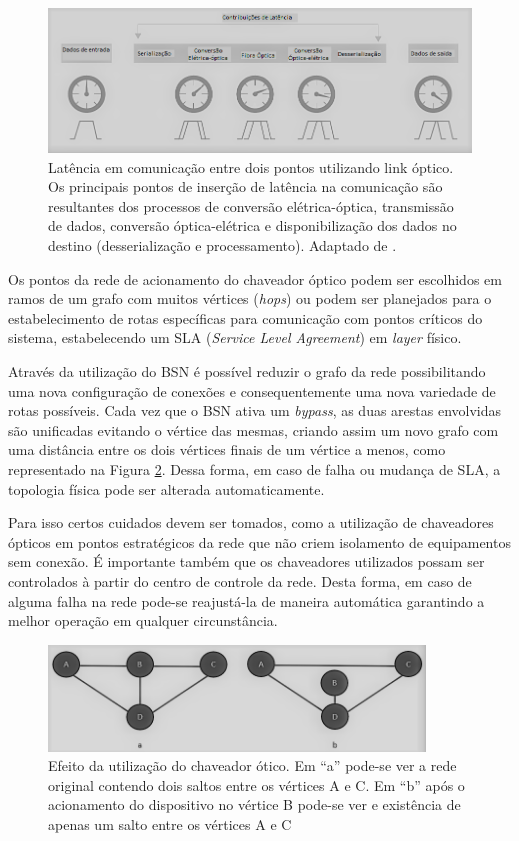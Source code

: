 \documentclass[12pt]{article}
\begin{document}
\begin{figure} %
	\centering
	\includegraphics[width=12cm]{latency_link}
	\caption{Latência em comunicação entre dois pontos utilizando link óptico. Os principais pontos de inserção de latência na comunicação são resultantes dos processos de conversão elétrica-óptica, transmissão de dados, conversão óptica-elétrica e disponibilização dos dados no destino (desserialização e processamento). Adaptado de \cite{Art_Coffey}.}
	\label{fig_latency_link}
\end{figure}

Os pontos da rede de acionamento do chaveador óptico podem ser escolhidos em ramos de um grafo com muitos vértices (\emph{hops}) ou podem ser planejados para o estabelecimento de rotas específicas para comunicação com pontos críticos do sistema, estabelecendo um SLA (\emph{Service Level Agreement}) em \emph{layer} físico.

Através da utilização do BSN é possível reduzir o grafo da rede possibilitando uma nova configuração de conexões e consequentemente uma nova variedade de rotas possíveis. Cada vez que o BSN ativa um \emph{bypass}, as duas arestas envolvidas são unificadas evitando o vértice das mesmas, criando assim um novo grafo com uma distância entre os dois vértices finais de um vértice a menos, como representado na Figura \ref{fig_bypass_exemplo}. Dessa forma, em caso de falha ou mudança de SLA, a topologia física pode ser alterada automaticamente.

Para isso certos cuidados devem ser tomados, como a utilização de chaveadores ópticos em pontos estratégicos da rede que não criem isolamento de equipamentos sem conexão. É importante também que os chaveadores utilizados possam ser controlados à partir do centro de controle da rede. Desta forma, em caso de alguma falha na rede pode-se reajustá-la de maneira automática garantindo a melhor operação em qualquer circunstância.

\begin{figure} %
	\centering
	\includegraphics[width=10cm]{Bypass_exemplo_PB}
	\caption{Efeito da utilização do chaveador ótico. Em ``a'' pode-se ver a rede original contendo dois saltos entre os vértices A e C. Em ``b'' após o acionamento do dispositivo no vértice B pode-se ver e existência de apenas um salto entre os vértices A e C}
	\label{fig_bypass_exemplo}
\end{figure}
\end{document}
